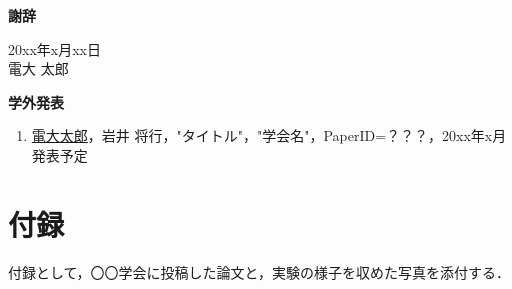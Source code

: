 \newpage
\pagestyle{plain}

\begin{flushleft}
{\huge{\bf 謝辞}}\\
\vspace{1cm}

\vspace{3cm}
\begin{flushright}
20xx年x月xx日\\
電大 太郎\\
\end{flushright}
\end{flushleft}

\newpage
\begin{flushleft}
{\huge{\bf 学外発表}}\\
\vspace{1cm}
\begin{enumerate}
\item \underline{電大太郎}，岩井 将行，"タイトル"，"学会名"，PaperID=？？？，20xx年x月発表予定

\end{enumerate}
\end{flushleft}



\chapter*{付録}\label{huroku}
\begin{flushleft}
付録として，〇〇学会に投稿した論文と，実験の様子を収めた写真を添付する．
\end{flushleft}

\newpage

\pagestyle{plain}

% 

\newpage
\restoregeometry

